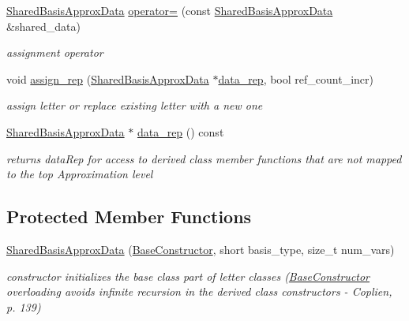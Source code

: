 \begin{DoxyCompactItemize}
\hyperlink{classPecos_1_1SharedBasisApproxData}{Shared\+Basis\+Approx\+Data} \hyperlink{classPecos_1_1SharedBasisApproxData_ab1446b60a1373dcff4117710b2e89252}{operator=} (const \hyperlink{classPecos_1_1SharedBasisApproxData}{Shared\+Basis\+Approx\+Data} \&shared\+\_\+data)
\begin{DoxyCompactList}\small\item\em assignment operator \end{DoxyCompactList}\item 
void \hyperlink{classPecos_1_1SharedBasisApproxData_ac00233a5ad75006391d658d0d3dfa87d}{assign\+\_\+rep} (\hyperlink{classPecos_1_1SharedBasisApproxData}{Shared\+Basis\+Approx\+Data} $\ast$\hyperlink{classPecos_1_1SharedBasisApproxData_a16b5577b2cccfb22d7d8de3479d180f1}{data\+\_\+rep}, bool ref\+\_\+count\+\_\+incr)\label{classPecos_1_1SharedBasisApproxData_ac00233a5ad75006391d658d0d3dfa87d}

\begin{DoxyCompactList}\small\item\em assign letter or replace existing letter with a new one \end{DoxyCompactList}\item 
\hyperlink{classPecos_1_1SharedBasisApproxData}{Shared\+Basis\+Approx\+Data} $\ast$ \hyperlink{classPecos_1_1SharedBasisApproxData_a16b5577b2cccfb22d7d8de3479d180f1}{data\+\_\+rep} () const \label{classPecos_1_1SharedBasisApproxData_a16b5577b2cccfb22d7d8de3479d180f1}

\begin{DoxyCompactList}\small\item\em returns data\+Rep for access to derived class member functions that are not mapped to the top Approximation level \end{DoxyCompactList}\end{DoxyCompactItemize}
\subsection*{Protected Member Functions}
\begin{DoxyCompactItemize}
\item 
\hyperlink{classPecos_1_1SharedBasisApproxData_af1c4e2cada2f5eb8410ede62ebeb27d7}{Shared\+Basis\+Approx\+Data} (\hyperlink{structPecos_1_1BaseConstructor}{Base\+Constructor}, short basis\+\_\+type, size\+\_\+t num\+\_\+vars)
\begin{DoxyCompactList}\small\item\em constructor initializes the base class part of letter classes (\hyperlink{structPecos_1_1BaseConstructor}{Base\+Constructor} overloading avoids infinite recursion in the derived class constructors -\/ Coplien, p. 139) \end{DoxyCompactList}\end{DoxyCompactItemize}
